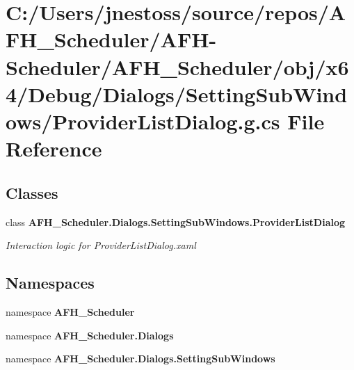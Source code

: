 \section{C\+:/\+Users/jnestoss/source/repos/\+A\+F\+H\+\_\+\+Scheduler/\+A\+F\+H-\/\+Scheduler/\+A\+F\+H\+\_\+\+Scheduler/obj/x64/\+Debug/\+Dialogs/\+Setting\+Sub\+Windows/\+Provider\+List\+Dialog.g.\+cs File Reference}
\label{x64_2_debug_2_dialogs_2_setting_sub_windows_2_provider_list_dialog_8g_8cs}
\subsection*{Classes}
\begin{DoxyCompactItemize}
\item 
class \textbf{ A\+F\+H\+\_\+\+Scheduler.\+Dialogs.\+Setting\+Sub\+Windows.\+Provider\+List\+Dialog}
\begin{DoxyCompactList}\small\item\em Interaction logic for Provider\+List\+Dialog.\+xaml \end{DoxyCompactList}\end{DoxyCompactItemize}
\subsection*{Namespaces}
\begin{DoxyCompactItemize}
\item 
namespace \textbf{ A\+F\+H\+\_\+\+Scheduler}
\item 
namespace \textbf{ A\+F\+H\+\_\+\+Scheduler.\+Dialogs}
\item 
namespace \textbf{ A\+F\+H\+\_\+\+Scheduler.\+Dialogs.\+Setting\+Sub\+Windows}
\end{DoxyCompactItemize}
